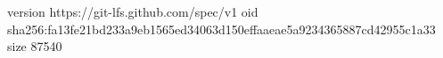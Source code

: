 version https://git-lfs.github.com/spec/v1
oid sha256:fa13fe21bd233a9eb1565ed34063d150effaaeae5a9234365887cd42955c1a33
size 87540
